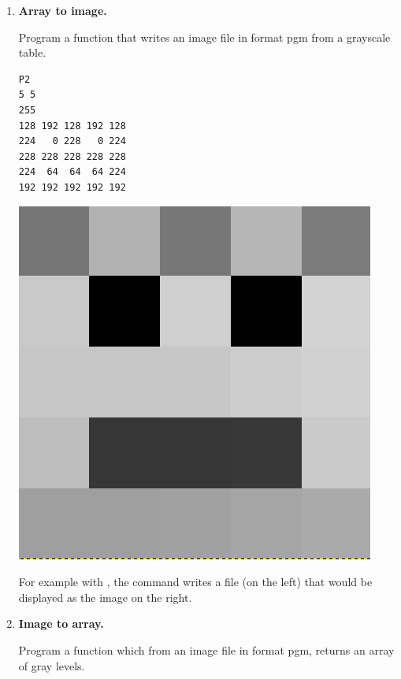\documentclass[11pt,class=report,crop=false]{standalone}
\begin{document}
\begin{activite}



\begin{enumerate}
  \item \textbf{Array to image.}
  
  Program a function  that writes an image file in format \og{}pgm\fg{} from a grayscale table.
  
\begin{center}
\begin{minipage}{0.3\textwidth}
\begin{lstlisting}
P2
5 5
255
128 192 128 192 128
224   0 228   0 224
228 228 228 228 228 
224  64  64  64 224 
192 192 192 192 192 
\end{lstlisting}
\end{minipage}
\begin{minipage}{0.3\textwidth}
\begin{center}
\includegraphics[scale=\myscale,scale=0.15]{input/ecran-test-pgm}
\end{center}
\end{minipage}
\end{center}
For example with , the command  writes a file  (on the left) that would be displayed as the image on the right.

  
  
  \item \textbf{Image to array.} 
  
  Program a function  
  which from an image file in format \og{}pgm\fg{}, returns an array of gray levels.
\end{enumerate}

\end{activite}
\end{document}
